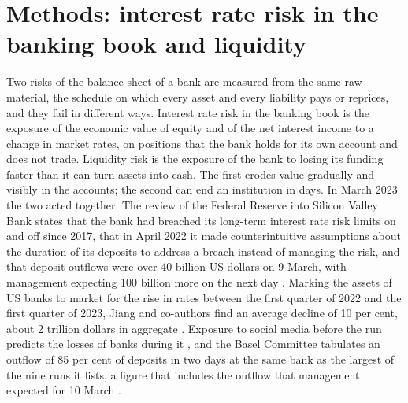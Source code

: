 
\section{Methods: interest rate risk in the banking book and liquidity}
\label{sec:alm}

Two risks of the balance sheet of a bank are measured from the same raw material, the schedule on which every asset and every liability pays or reprices, and they fail in different ways. Interest rate risk in the banking book is the exposure of the economic value of equity and of the net interest income to a change in market rates, on positions that the bank holds for its own account and does not trade. Liquidity risk is the exposure of the bank to losing its funding faster than it can turn assets into cash. The first erodes value gradually and visibly in the accounts; the second can end an institution in days. In March 2023 the two acted together. The review of the Federal Reserve into Silicon Valley Bank states that the bank had breached its long-term interest rate risk limits on and off since 2017, that in April 2022 it made counterintuitive assumptions about the duration of its deposits to address a breach instead of managing the risk, and that deposit outflows were over 40 billion US dollars on 9 March, with management expecting 100 billion more on the next day \citep{alm:fed2023}. Marking the assets of US banks to market for the rise in rates between the first quarter of 2022 and the first quarter of 2023, Jiang and co-authors find an average decline of 10 per cent, about 2 trillion dollars in aggregate \citep{alm:jiang2024}. Exposure to social media before the run predicts the losses of banks during it \citep{alm:cookson2026}, and the Basel Committee tabulates an outflow of 85 per cent of deposits in two days at the same bank as the largest of the nine runs it lists, a figure that includes the outflow that management expected for 10 March \citep{alm:bcbs2023}.

